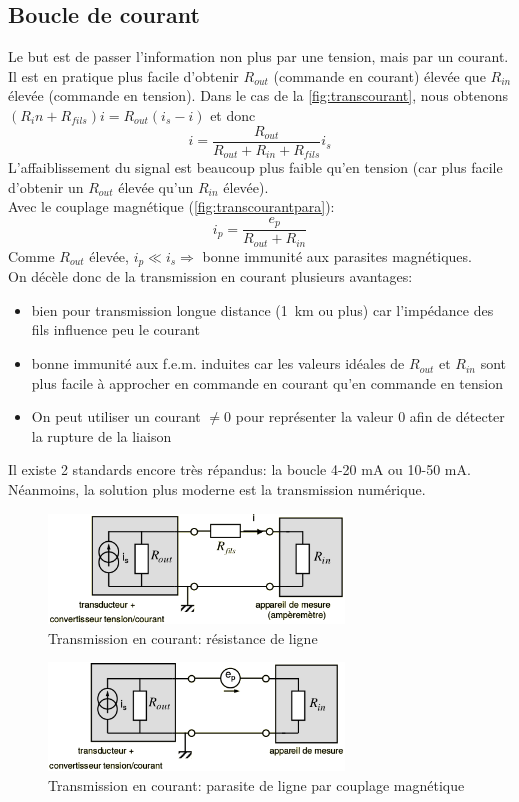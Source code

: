 \subsection{Boucle de courant}
Le but est de passer l'information non plus par une tension, mais par un courant. Il est en pratique plus facile d'obtenir \(R_{out}\) (commande en courant) élevée que \(R_{in}\) élevée (commande en tension). Dans le cas de la \autoref{fig:transcourant}, nous obtenons \((R_in+R_{fils})i = R_{out}(i_s-i)\) et donc
\[i=\frac{R_{out}}{R_{out}+R_{in}+R_{fils}}i_s\]
L'affaiblissement du signal est beaucoup plus faible qu'en tension (car plus facile d'obtenir un \(R_{out}\) élevée qu'un \(R_{in}\) élevée).\\
Avec le couplage magnétique (\autoref{fig:transcourantpara}):
\[i_p=\frac{e_p}{R_{out}+R_{in}}\]
Comme \(R_{out}\) élevée, \(i_p\ll i_s \Rightarrow\) bonne immunité aux parasites magnétiques.\\
On décèle donc de la transmission en courant plusieurs avantages:
\begin{itemize}
	\item bien pour transmission longue distance (\SI{1}{\kilo\meter} ou plus) car l'impédance des fils influence peu le courant
	\item bonne immunité aux f.e.m. induites car les valeurs idéales de \(R_{out}\text{ et }R_{in}\) sont plus facile à approcher en commande en courant qu'en commande en tension
	\item On peut utiliser un courant \(\neq0\) pour représenter la valeur 0 afin de détecter la rupture de la liaison
\end{itemize}
Il existe 2 standards encore très répandus: la boucle 4-20 \si{\milli\ampere} ou 10-50 \si{\milli\ampere}. Néanmoins, la solution plus moderne est la transmission numérique.
\begin{figure}[H] 
	\centering 
	\includegraphics[width=0.7\textwidth,height=10\baselineskip,keepaspectratio]{ch3/image35} 
	\caption{Transmission en courant: résistance de ligne} 
	\label{fig:transcourant}
\end{figure}
\begin{figure}[H] 
	\centering 
	\includegraphics[width=0.7\textwidth,height=10\baselineskip,keepaspectratio]{ch3/image36} 
	\caption{Transmission en courant: parasite de ligne par couplage magnétique} 
	\label{fig:transcourantpara}
\end{figure}
